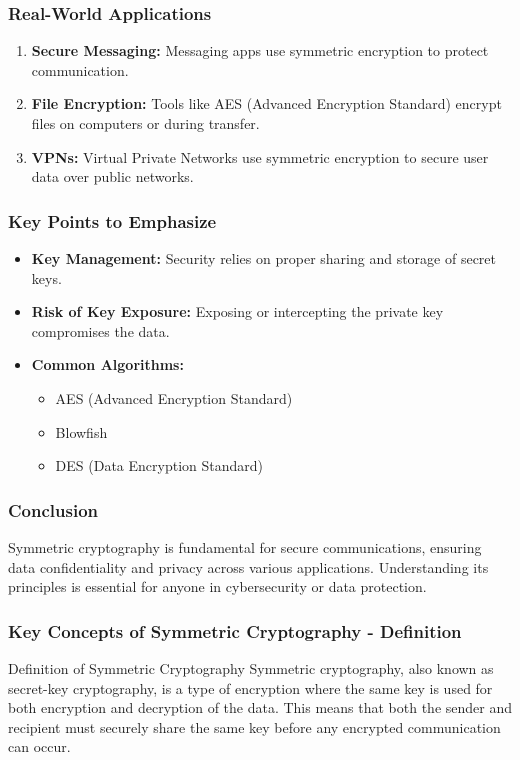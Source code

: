 \documentclass{beamer}
\begin{document}
\begin{frame}[fragile]
    \frametitle{Real-World Applications}
    \begin{enumerate}
        \item \textbf{Secure Messaging:} Messaging apps use symmetric encryption to protect communication. 
        \item \textbf{File Encryption:} Tools like AES (Advanced Encryption Standard) encrypt files on computers or during transfer.
        \item \textbf{VPNs:} Virtual Private Networks use symmetric encryption to secure user data over public networks.
    \end{enumerate}
\end{frame}

\begin{frame}[fragile]
    \frametitle{Key Points to Emphasize}
    \begin{itemize}
        \item \textbf{Key Management:} Security relies on proper sharing and storage of secret keys.
        \item \textbf{Risk of Key Exposure:} Exposing or intercepting the private key compromises the data.
        \item \textbf{Common Algorithms:}
        \begin{itemize}
            \item AES (Advanced Encryption Standard)
            \item Blowfish
            \item DES (Data Encryption Standard)
        \end{itemize}
    \end{itemize}
\end{frame}

\begin{frame}[fragile]
    \frametitle{Conclusion}
    Symmetric cryptography is fundamental for secure communications, ensuring data confidentiality and privacy across various applications. Understanding its principles is essential for anyone in cybersecurity or data protection.
\end{frame}

\begin{frame}[fragile]
    \frametitle{Key Concepts of Symmetric Cryptography - Definition}
    \begin{block}{Definition of Symmetric Cryptography}
        Symmetric cryptography, also known as secret-key cryptography, is a type of encryption where the same key is used for both encryption and decryption of the data. This means that both the sender and recipient must securely share the same key before any encrypted communication can occur.
    \end{block}
\end{frame}
\end{document}
